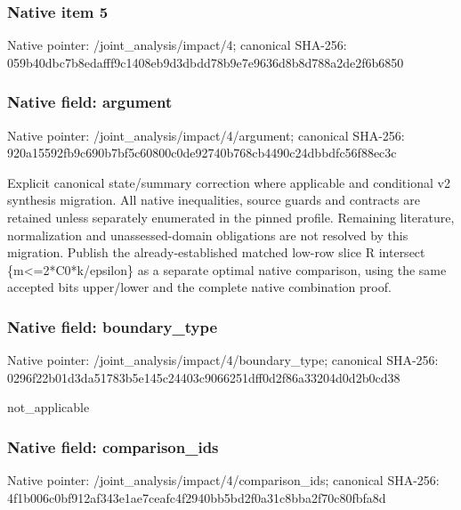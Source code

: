\documentclass[10pt,a4paper]{article}
\begin{document}
\subsubsection{Native item 5}
Native pointer: /joint\_\allowbreak{}analysis/impact/4; canonical SHA-256: 059b40dbc7b8edafff9c1408eb9d3dbdd78b9e7e9636d8b8d788a2de2f6b6850

\subsubsection{Native field: argument}
Native pointer: /joint\_\allowbreak{}analysis/impact/4/argument; canonical SHA-256: 920a15592fb9c690b7bf5c60800c0de92740b768cb4490c24dbbdfc56f88ec3c

\begingroup\raggedright\sloppy Explicit canonical state/\allowbreak{}summary correction where applicable and conditional v2 synthesis migration. All native inequalities,\allowbreak{} source guards and contracts are retained unless separately enumerated in the pinned profile. Remaining literature,\allowbreak{} normalization and unassessed-domain obligations are not resolved by this migration. Publish the already-established matched low-row slice R intersect \{m<=\allowbreak{}2*C0*k/\allowbreak{}epsilon\} as a separate optimal native comparison,\allowbreak{} using the same accepted bits upper/\allowbreak{}lower and the complete native combination proof.\par\endgroup

\subsubsection{Native field: boundary\_\allowbreak{}type}
Native pointer: /joint\_\allowbreak{}analysis/impact/4/boundary\_\allowbreak{}type; canonical SHA-256: 0296f22b01d3da51783b5e145c24403c9066251dff0d2f86a33204d0d2b0cd38

\begingroup\raggedright\sloppy not\_\allowbreak{}applicable\par\endgroup

\subsubsection{Native field: comparison\_\allowbreak{}ids}
Native pointer: /joint\_\allowbreak{}analysis/impact/4/comparison\_\allowbreak{}ids; canonical SHA-256: 4f1b006c0bf912af343e1ae7ceafc4f2940bb5bd2f0a31c8bba2f70c80fbfa8d
\end{document}
